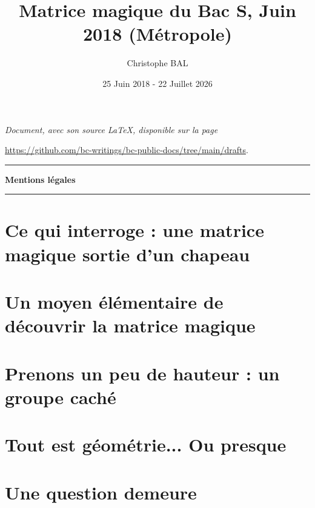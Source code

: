 \documentclass[12pt]{amsart}
\newcommand\squote[1]{\og #1 \fg{}}
\begin{document}
\title{Matrice magique du Bac S, Juin 2018 (Métropole)}
\author{Christophe BAL}
\date{25 Juin 2018 - 22 Juillet 2026}
\maketitle


\begin{center}
	\itshape
	Document, avec son source \LaTeX, disponible sur la page

	\url{https://github.com/bc-writings/bc-public-docs/tree/main/drafts}.
\end{center}


\bigskip


\begin{center}
	\hrule\vspace{.3em}
	{
		\fontsize{1.35em}{1em}\selectfont
		\textbf{Mentions \og légales \fg}
	}

	\vspace{0.45em}
	\doclicenseThis
	\hrule
\end{center}



\setcounter{tocdepth}{2}
\tableofcontents



\section{Ce qui interroge : une matrice \squote{magique} sortie d'un chapeau}





\section{Un moyen élémentaire de découvrir la matrice \squote{magique}}





\section{Prenons un peu de hauteur : un groupe \squote{caché}}





\section{Tout est géométrie... Ou presque}





\section{Une question demeure}


\end{document}
